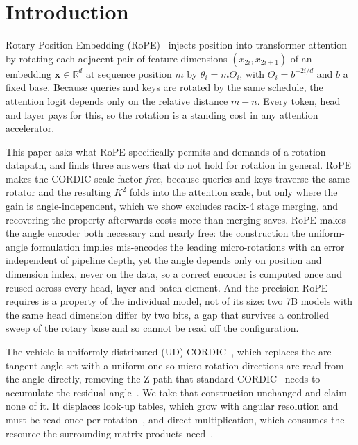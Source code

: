 \documentclass[conference]{IEEEtran}
\begin{document}
\section{Introduction}

Rotary Position Embedding (RoPE)~\cite{c9} injects position into transformer
attention
by rotating each adjacent pair of feature dimensions $(x_{2i}, x_{2i+1})$ of an
embedding $\mathbf{x} \in \mathbb{R}^{d}$ at sequence position $m$ by
$\theta_i = m\Theta_i$, with $\Theta_i = b^{-2i/d}$ and $b$ a fixed base. Because
queries and keys are rotated by the same schedule, the attention logit depends
only on the relative distance $m-n$. Every token, head and layer pays for this,
so the rotation is a standing cost in any attention accelerator.

This paper asks what RoPE specifically permits and demands of a rotation
datapath, and finds three answers that do not hold for rotation in general.
RoPE makes the CORDIC scale factor \emph{free}, because queries and keys
traverse the same rotator and the resulting $K^2$ folds into the attention
scale, but only where the gain is angle-independent, which we show excludes
radix-4 stage merging, and recovering the property afterwards costs more than
merging saves. RoPE makes the angle encoder both necessary and nearly free: the
construction the uniform-angle formulation implies mis-encodes the leading
micro-rotations with an error independent of pipeline depth, yet the angle
depends only on position and dimension index, never on the data, so a correct
encoder is computed once and reused across every head, layer and batch element.
And the precision RoPE requires is a property of the individual model, not of
its size: two 7B models with the same head dimension differ by two bits, a gap
that survives a controlled sweep of the rotary base and so cannot be read off
the configuration.

The vehicle is uniformly distributed (UD) CORDIC~\cite{ud}, which replaces the
arc-tangent angle set with a uniform one so micro-rotation directions are read
from the angle directly, removing the Z-path that standard
CORDIC~\cite{c2,c3,c15} needs to accumulate the residual
angle~\cite{c7,c10}. We take that construction unchanged and claim none of it.
It displaces look-up tables, which grow with angular resolution and must be read
once per rotation~\cite{c5}, and direct multiplication, which consumes the
resource the surrounding matrix products need~\cite{standard_cordic_rope}.
\end{document}
